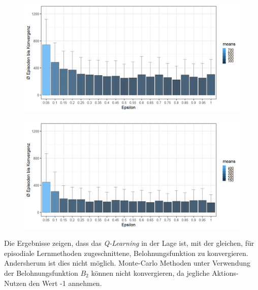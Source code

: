 \begin{figure}[H]
  \centering
  \begin{minipage}{.5\textwidth}
    \centering
    \includegraphics[width=\textwidth]{images/SimpleZ2B1QLearningA}
    \label{fig:test1}
  \end{minipage}%
  \begin{minipage}{.5\textwidth}
    \centering
    \includegraphics[width=\textwidth]{images/SimpleZ2B1QLearningMaxA}
    \label{fig:test2}
  \end{minipage}
\end{figure}
Die Ergebnisse zeigen, dass das \textit{Q-Learning} in der Lage ist, mit der gleichen, für episodiale Lernmethoden zugeschnittene, Belohnungsfunktion zu konvergieren. Andersherum ist dies nicht möglich. Monte-Carlo Methoden unter Verwendung der Belohnungsfunktion $B_2$ können nicht konvergieren, da jegliche Aktions-Nutzen den Wert -1 annehmen.
\par 
